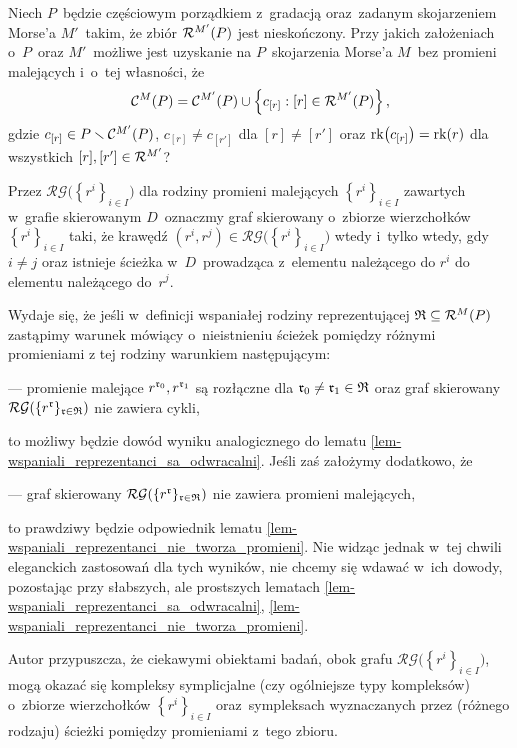 \begin{problem}\label{prob5}
Niech $P$~będzie częściowym porządkiem z~gradacją oraz~zadanym skojarzeniem Morse'a $M'$~takim, że zbiór $\mathcal{R}^{M'}(P)$ jest nieskończony. 
Przy jakich założeniach o~$P$~oraz $M'$~możliwe jest uzyskanie na $P$~skojarzenia Morse'a $M$~bez promieni malejących i~o~tej własności, że \[\mathcal{C}^{M}(P)=\mathcal{C}^{M'}(P)\cup \left\{c_{[r]}:[r]\in\mathcal{R}^{M'}(P)\right\},\] gdzie $c_{[r]}\in P\smallsetminus \mathcal{C}^{M'}(P)$, $c_{[r]}\not=c_{[r']}$ dla $[r]\not=[r']$ oraz $\operatorname{rk}\bigl(c_{[r]}\bigr)=\operatorname{rk}(r)$ dla wszystkich $[r],[r']\in\mathcal{R}^{M'}$? 
\end{problem}

Przez $\mathcal{RG}\bigl(\left\{r^i\right\}_{i\in I}\bigr)$ dla rodziny promieni malejących $\left\{r^i\right\}_{i\in I}$ zawartych w~grafie skierowanym $D$~oznaczmy graf skierowany o~zbiorze wierzchołków $\left\{r^i\right\}_{i\in I}$ taki, że krawędź $\left(r^i,r^j\right)\in \mathcal{RG}\bigl(\left\{r^i\right\}_{i\in I}\bigr)$ wtedy i~tylko wtedy, gdy $i\not=j$ oraz istnieje ścieżka  w~$D$~prowadząca z~elementu należącego do $r^i$ do elementu należącego do~$r^j$.

Wydaje się, że jeśli w~definicji wspaniałej rodziny reprezentującej $\mathfrak{R}\subseteq \mathcal{R}^M(P)$ zastąpimy warunek mówiący o~nieistnieniu ścieżek pomiędzy różnymi promieniami z tej rodziny warunkiem następującym:
\begin{compactitem}
\item[---]promienie malejące $r^{\mathfrak{r}_0},r^{\mathfrak{r}_1}$ są rozłączne dla $\mathfrak{r}_0\not=\mathfrak{r}_1\in\mathfrak{R}$ oraz graf skierowany $\mathcal{RG}(\{r^{\mathfrak{r}}\}_{\mathfrak{r}\in\mathfrak{R}})$ nie zawiera cykli,
\end{compactitem}
to możliwy będzie dowód wyniku analogicznego do lematu \ref{lem-wspaniali_reprezentanci_sa_odwracalni}. Jeśli zaś założymy dodatkowo, że
\begin{compactitem}
\item[---]graf skierowany $\mathcal{RG}(\{r^{\mathfrak{r}}\}_{\mathfrak{r}\in\mathfrak{R}})$ nie zawiera promieni malejących,
\end{compactitem}
to prawdziwy będzie odpowiednik lematu \ref{lem-wspaniali_reprezentanci_nie_tworza_promieni}. Nie widząc jednak w~tej chwili eleganckich zastosowań dla tych wyników, nie chcemy się wdawać w~ich dowody, pozostając przy słabszych, ale prostszych lematach \ref{lem-wspaniali_reprezentanci_sa_odwracalni}, \ref{lem-wspaniali_reprezentanci_nie_tworza_promieni}.

Autor przypuszcza, że ciekawymi obiektami badań, obok grafu $\mathcal{RG}\bigl(\left\{r^i\right\}_{i\in I}\bigr)$, mogą okazać się kompleksy symplicjalne (czy ogólniejsze typy kompleksów) o~zbiorze wierzchołków $\left\{r^i\right\}_{i\in I}$ oraz~sympleksach wyznaczanych przez (różnego rodzaju) ścieżki pomiędzy promieniami z~tego zbioru.

